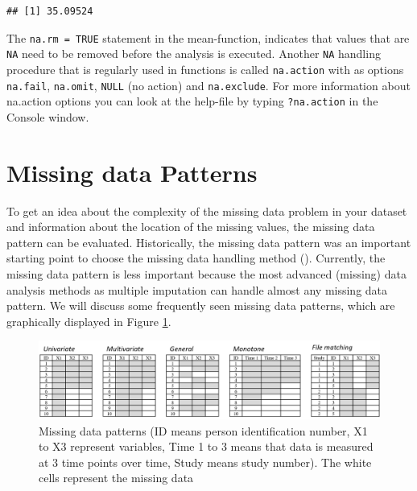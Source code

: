 \documentclass[]{book}
\newenvironment{Shaded}{\begin{snugshade}}{\end{snugshade}}
\newcommand{\KeywordTok}[1]{\textcolor[rgb]{0.13,0.29,0.53}{\textbf{#1}}}
\newcommand{\DataTypeTok}[1]{\textcolor[rgb]{0.13,0.29,0.53}{#1}}
\newcommand{\OtherTok}[1]{\textcolor[rgb]{0.56,0.35,0.01}{#1}}
\newcommand{\OperatorTok}[1]{\textcolor[rgb]{0.81,0.36,0.00}{\textbf{#1}}}
\newcommand{\NormalTok}[1]{#1}
\begin{document}
\begin{Shaded}
\end{Shaded}

\begin{verbatim}
## [1] 35.09524
\end{verbatim}

The \texttt{na.rm\ =\ TRUE} statement in the mean-function, indicates
that values that are \texttt{NA} need to be removed before the analysis
is executed. Another \texttt{NA} handling procedure that is regularly
used in functions is called \texttt{na.action} with as options
\texttt{na.fail}, \texttt{na.omit}, \texttt{NULL} (no action) and
\texttt{na.exclude}. For more information about na.action options you
can look at the help-file by typing \texttt{?na.action} in the Console
window.

\section{Missing data Patterns}\label{missing-data-patterns}

To get an idea about the complexity of the missing data problem in your
dataset and information about the location of the missing values, the
missing data pattern can be evaluated. Historically, the missing data
pattern was an important starting point to choose the missing data
handling method (\citet{little1987statistical}). Currently, the missing
data pattern is less important because the most advanced (missing) data
analysis methods as multiple imputation can handle almost any missing
data pattern. We will discuss some frequently seen missing data
patterns, which are graphically displayed in Figure \ref{fig:fig2-2}.

\begin{figure}

{\centering \includegraphics[width=0.9\linewidth]{images/fig2.2} 

}

\caption{Missing data patterns (ID means person identification number, X1 to X3 represent variables, Time 1 to 3 means that data is measured at 3 time points over time, Study means study number). The white cells represent the missing data}\label{fig:fig2-2}
\end{figure}
\end{document}
